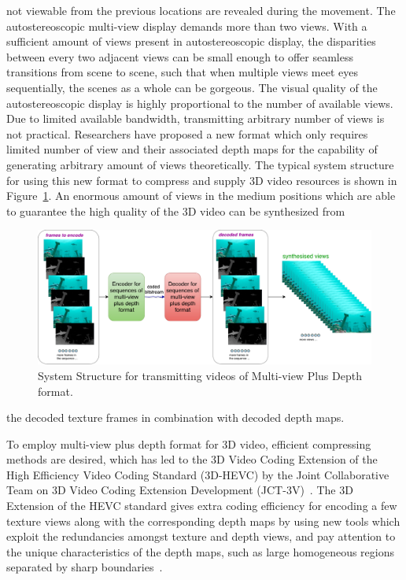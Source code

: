 not viewable from the previous locations are revealed during the movement.
The autostereoscopic multi-view display demands more than two views.
With a sufficient amount of views present in autostereoscopic display, the
disparities between every two adjacent views can be small enough to offer
seamless transitions from scene to scene, such that when multiple views
meet eyes sequentially, the scenes as a whole can be gorgeous.
The visual quality of the autostereoscopic display is highly proportional to
the number of available views.
Due to limited available bandwidth, transmitting arbitrary number of views
is not practical.
Researchers have proposed a new format which only requires limited number
of view and their associated depth maps for the capability of
generating arbitrary amount of views theoretically.
The typical system structure for using this new format to compress and supply 3D video
resources is shown in Figure~\ref{fig:SS-MVD}.
An enormous amount of views in the medium positions which are able to
guarantee the high quality of the 3D video can be synthesized from
\begin{figure}[!b]
    \centering
    \includegraphics[width=\textwidth,height=\textheight,keepaspectratio]{Figures/SystemStructureOf3DEncoder}
    \caption[System Structure for transmitting videos of Multi-view Plus Depth format]{System Structure for transmitting videos of Multi-view Plus Depth format.}
    \label{fig:SS-MVD}
\end{figure}
the decoded texture frames in combination with decoded depth maps.

To employ multi-view plus depth format for 3D video, efficient compressing
methods are desired, which has led to the 3D Video Coding Extension of the
High Efficiency Video Coding Standard (3D-HEVC) by the Joint Collaborative Team
on 3D Video Coding Extension Development (JCT-3V)~\parencite{RN195}.
The 3D Extension of the HEVC standard gives extra coding efficiency
for encoding a few texture views along with the corresponding depth maps by
using new tools which exploit the redundancies amongst
texture and depth views, and pay attention to the unique characteristics of
the depth maps, such as large homogeneous
regions separated by sharp boundaries~\parencite{RN47}.

